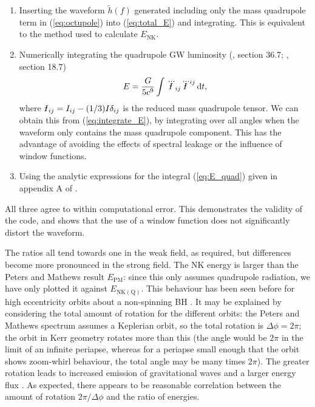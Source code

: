 \documentclass[useAMS,usedcolumn,usegraphicx,usenatbib]{mn2e}
\newcommand{\eqnref}[1]{(\ref{eq:#1})}
\newcommand{\sub}[1]{\ensuremath{_\mathrm{#1}}}
\newcommand{\dd}{\ensuremath{\mathrm{d}}}
\newcommand{\intd}[4]{\ensuremath{\int_{#1}^{#2}{#3}\,\dd{#4}}}
\newcommand{\Ibar}{{\declareslashed{}{\text{-}}{0.04}{-0.2}{I}\slashed{I}}}
\begin{document}
\begin{enumerate}
\item Inserting the waveform $\widetilde{h}(f)$ generated including only the mass quadrupole term in \eqnref{octupole} into \eqnref{total_E} and integrating. This is equivalent to the method used to calculate $E\sub{NK}$.
\item Numerically integrating the quadrupole GW luminosity (\citealt{Misner1973}, section 36.7; \citealt{Hobson2006}, section 18.7)
\begin{equation}
E = \frac{G}{5c^9}\intd{}{}{\dddot{\Ibar}_{ij}\dddot{\Ibar}^{ij}}{t},
\label{eq:E_quad}
\end{equation}
where $\Ibar_{ij} = I_{ij} - (1/3)I\delta_{ij}$ is the reduced mass quadrupole tensor. We can obtain this from \eqnref{integrate_E}, by integrating over all angles when the waveform only contains the mass quadrupole component. This has the advantage of avoiding the effects of spectral leakage or the influence of window functions.
\item Using the analytic expressions for the integral \eqnref{E_quad} given in appendix A of \citet{Gair2005}.
\end{enumerate}
All three agree to within computational error. This demonstrates the validity of the code, and shows that the use of a window function does not significantly distort the waveform.

The ratios all tend towards one in the weak field, as required, but differences become more pronounced in the strong field. The NK energy is larger than the Peters and Mathews result $E\sub{PM}$: since this only assumes quadrupole radiation, we have only plotted it against $E\sub{NK(Q)}$. This behaviour has been seen before for high eccentricity orbits about a non-spinning BH \citep{Gair2005}. It may be explained by considering the total amount of rotation for the different orbits: the Peters and Mathews spectrum assumes a Keplerian orbit, so the total rotation is $\Delta\phi = 2\pi$; the orbit in Kerr geometry rotates more than this (the angle would be $2\pi$ in the limit of an infinite periapse, whereas for a periapse small enough that the orbit shows zoom-whirl behaviour, the total angle may be many times $2\pi$). The greater rotation leads to increased emission of gravitational waves and a larger energy flux \citep{Berry2010}. As expected, there appears to be reasonable correlation between the amount of rotation $2\pi/\Delta\phi$ and the ratio of energies.
\end{document}
